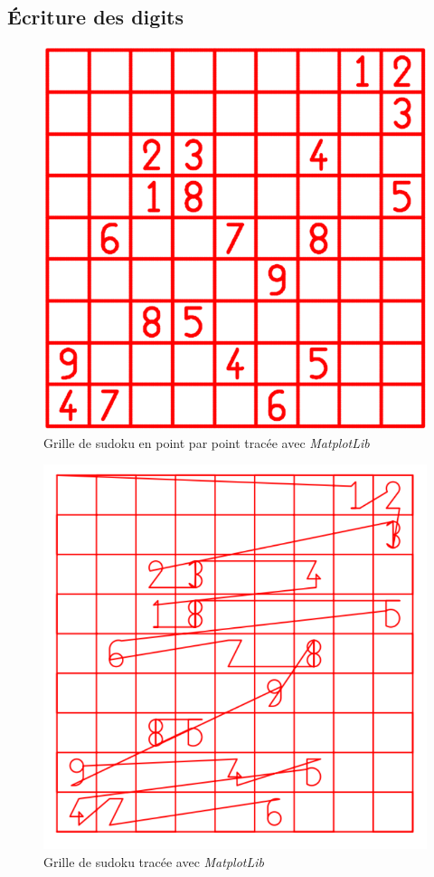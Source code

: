 \documentclass[12pt,a4paper]{report}
\begin{document}
\subsection{Écriture des digits}
\begin{figure}[!h]
 \center
 \includegraphics[scale=0.5]{../pictures/Sudoku_points}
 \caption{Grille de sudoku en point par point tracée avec \emph{MatplotLib}}
\end{figure}

\begin{figure}[!h]
 \center
 \includegraphics[scale=0.5]{../pictures/Sudoku_relies}
 \caption{Grille de sudoku tracée avec \emph{MatplotLib}}
\end{figure}
\end{document}

